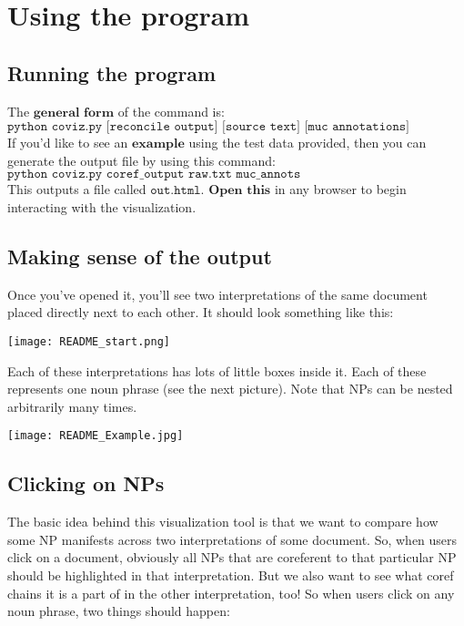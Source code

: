 \documentclass[a4paper]{article}
\begin{document}
\section{Using the program}

\subsection{Running the program}

The $\textbf{general form}$ of the command is: \\

$\texttt{python coviz.py [reconcile output] [source text] [muc annotations]}$ \\

If you'd like to see an $\textbf{example}$ using the test data provided, then you can generate the output file by using this command: \\

$\texttt{python coviz.py coref\_output raw.txt muc\_annots}$ \\

This outputs a file called $\texttt{out.html}$. $\textbf{Open this}$ in any browser to begin interacting with the visualization.

\subsection{Making sense of the output}

Once you've opened it, you'll see two interpretations of the same document placed directly next to each other. It should look something like this:

\texttt{[image: README\_start.png]}

Each of these interpretations has lots of little boxes inside it. Each of these represents one noun phrase (see the next picture). Note that NPs can be nested arbitrarily many times.

\texttt{[image: README\_Example.jpg]}

\subsection{Clicking on NPs}

The basic idea behind this visualization tool is that we want to compare how some NP manifests across two interpretations of some document. So, when users click on a document, obviously all NPs that are coreferent to that particular NP should be highlighted in that interpretation. But we also want to see what coref chains it is a part of in the other interpretation, too! So when users click on any noun phrase, two things should happen:
\end{document}
